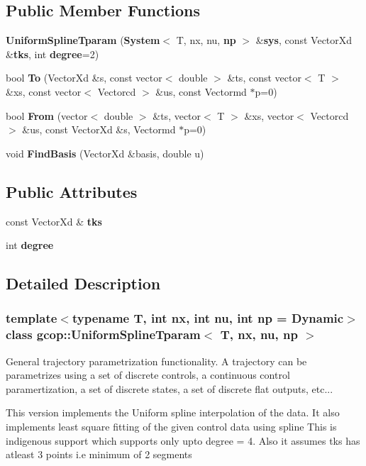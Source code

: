 \subsection*{\-Public \-Member \-Functions}
\begin{DoxyCompactItemize}
\item 
{\bf \-Uniform\-Spline\-Tparam} ({\bf \-System}$<$ \-T, nx, nu, {\bf np} $>$ \&{\bf sys}, const \-Vector\-Xd \&{\bf tks}, int {\bf degree}=2)
\item 
bool {\bf \-To} (\-Vector\-Xd \&s, const vector$<$ double $>$ \&ts, const vector$<$ \-T $>$ \&xs, const vector$<$ \-Vectorcd $>$ \&us, const \-Vectormd $\ast$p=0)
\item 
bool {\bf \-From} (vector$<$ double $>$ \&ts, vector$<$ \-T $>$ \&xs, vector$<$ \-Vectorcd $>$ \&us, const \-Vector\-Xd \&s, \-Vectormd $\ast$p=0)
\item 
void {\bf \-Find\-Basis} (\-Vector\-Xd \&basis, double u)
\end{DoxyCompactItemize}
\subsection*{\-Public \-Attributes}
\begin{DoxyCompactItemize}
\item 
const \-Vector\-Xd \& {\bf tks}
\item 
int {\bf degree}
\end{DoxyCompactItemize}


\subsection{\-Detailed \-Description}
\subsubsection*{template$<$typename T, int nx, int nu, int np = \-Dynamic$>$class gcop\-::\-Uniform\-Spline\-Tparam$<$ T, nx, nu, np $>$}

\-General trajectory parametrization functionality. \-A trajectory can be parametrizes using a set of discrete controls, a continuous control paramertization, a set of discrete states, a set of discrete flat outputs, etc...

\-This version implements the \-Uniform spline interpolation of the data. \-It also implements least square fitting of the given control data using spline \-This is indigenous support which supports only upto degree = 4. \-Also it assumes tks has atleast 3 points i.\-e minimum of 2 segments

